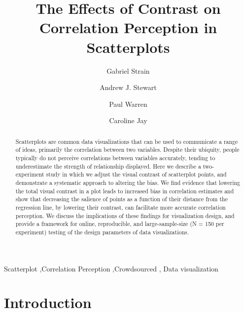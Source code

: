 \documentclass[preprint, 3p,
authoryear]{elsarticle} %
\begin{document}
\begin{frontmatter}

  \title{The Effects of Contrast on Correlation Perception in
Scatterplots}
    \author[CS]{Gabriel Strain%
  }
    \author[CS]{Andrew J. Stewart%
  }
    \author[SSS]{Paul Warren%
  }
    \author[CS]{Caroline Jay%
  }
  
  \begin{abstract}
  Scatterplots are common data visualizations that can be used to
  communicate a range of ideas, primarily the correlation between two
  variables. Despite their ubiquity, people typically do not perceive
  correlations between variables accurately, tending to underestimate
  the strength of relationship displayed. Here we describe a
  two-experiment study in which we adjust the visual contrast of
  scatterplot points, and demonstrate a systematic approach to altering
  the bias. We find evidence that lowering the total visual contrast in
  a plot leads to increased bias in correlation estimates and show that
  decreasing the salience of points as a function of their distance from
  the regression line, by lowering their contrast, can facilitate more
  accurate correlation perception. We discuss the implications of these
  findings for visualization design, and provide a framework for online,
  reproducible, and large-sample-size (N = 150 per experiment) testing
  of the design parameters of data visualizations.
  \end{abstract}
    \begin{keyword}
    Scatterplot \sep Correlation Perception \sep Crowdsourced \sep 
    Data visualization
  \end{keyword}
  
 \end{frontmatter}

\hypertarget{introduction}{%
\section{Introduction}\label{introduction}}
\end{document}
